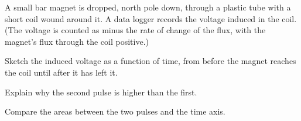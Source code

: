 A small bar magnet is dropped, north pole down, through a plastic tube with a short coil wound around it. A data logger records the voltage induced in the coil. (The voltage is counted as minus the rate of change of the flux, with the magnet's flux through the coil positive.)

\begin{abcliste}
\abc Sketch the induced voltage as a function of time, from before the magnet reaches the coil until after it has left it.

\abc Explain why the second pulse is higher than the first.

\abc Compare the areas between the two pulses and the time axis.
\end{abcliste}
